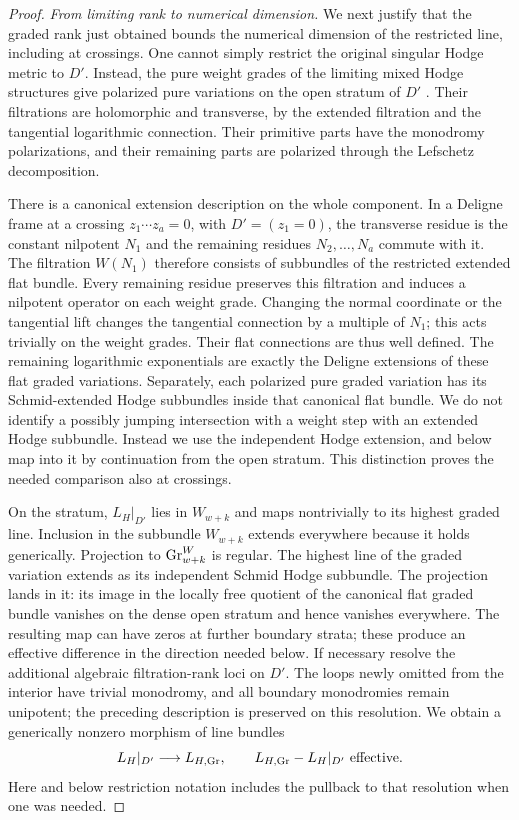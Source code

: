 \begin{proof}
\smallskip\noindent
\emph{From limiting rank to numerical dimension.}
\label{proof:limiting-weight-comparison}
We next justify that the graded rank just obtained bounds the numerical
dimension of the restricted line, including at crossings.
One cannot simply restrict the original singular Hodge
metric to $D'$.  Instead, the pure weight grades of the
limiting mixed Hodge structures give polarized pure
variations on the open stratum of $D'$
\cite[Proposition~2.10]{CK}.  Their filtrations
are holomorphic and transverse, by the extended filtration
and the tangential logarithmic connection.  Their primitive
parts have the monodromy polarizations, and their remaining
parts are polarized through the Lefschetz decomposition.

There is a canonical extension description on the whole
component.  In a Deligne frame at a crossing
$z_1\cdots z_a=0$, with $D'=(z_1=0)$, the transverse residue
is the constant nilpotent $N_1$ and the remaining residues
$N_2,\ldots,N_a$ commute with it.  The filtration $W(N_1)$
therefore consists of subbundles of the restricted extended
flat bundle.  Every remaining residue preserves this
filtration and induces a nilpotent operator on each weight
grade.  Changing the normal coordinate or the tangential
lift changes the tangential connection by a multiple of
$N_1$; this acts trivially on the weight grades.  Their flat connections are thus well defined. The remaining logarithmic
exponentials are exactly the Deligne extensions of these flat graded
variations. Separately, each polarized pure graded variation has its
Schmid-extended Hodge subbundles inside that canonical flat bundle.
We do not identify a possibly jumping intersection with a weight step
with an extended Hodge subbundle. Instead we use the independent Hodge
extension, and below map into it by continuation from the open stratum.
This distinction proves the needed comparison also at crossings.

On the stratum, $L_H|_{D'}$ lies in $W_{w+k}$ and maps
nontrivially to its highest graded line.  Inclusion in the
subbundle $W_{w+k}$ extends everywhere because it holds
generically.  Projection to $\operatorname{Gr}^W_{w+k}$ is regular.  The highest line of the graded variation extends as its independent
Schmid Hodge subbundle. The projection lands in it: its image in the
locally free quotient of the canonical flat graded bundle vanishes on
the dense open stratum and hence vanishes everywhere. The resulting
map can have zeros at further boundary strata; these produce an
effective difference in the direction needed below.  If necessary resolve
the additional algebraic filtration-rank loci on $D'$.
The loops newly omitted from the interior have trivial
monodromy, and all boundary monodromies remain unipotent;
the preceding description is preserved on this resolution.
We obtain a generically nonzero morphism of line bundles
\begin{equation}\label{eq:boundary-line-comparison}
                 L_H|_{D'}\longrightarrow L_{H,\operatorname{Gr}},
                 \qquad L_{H,\operatorname{Gr}}-L_H|_{D'}\ \text{effective}.
\end{equation}
Here and below restriction notation includes the pullback
to that resolution when one was needed.


\end{proof}
